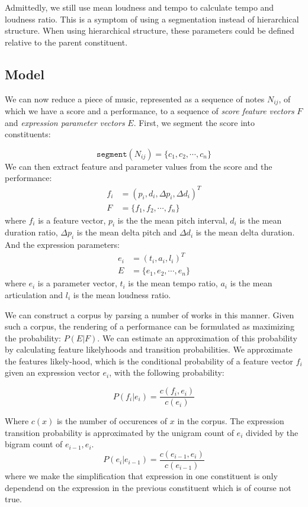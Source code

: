 \documentclass[a4paper,10pt]{article}
\begin{document}
Admittedly, we still use mean loudness and tempo to calculate tempo and loudness ratio. This is a symptom of using a segmentation instead of hierarchical structure. When using hierarchical structure, these parameters could be defined relative to the parent constituent.

\subsection{Model}
\label{sec:model}


We can now reduce a piece of music, represented as a sequence of notes $N_{ij}$, of which we have a score and a performance, to a sequence of \textit{score feature vectors} $F$ and \textit{expression parameter vectors} $E$. First, we segment the score into constituents:

\[\texttt{segment}(N_{ij}) = \{c_1, c_2, \cdots, c_n\}\]
We can then extract feature and parameter values from the score and the performance:
\begin{align*}
f_i &= (p_i, d_i, \Delta p_i, \Delta d_i)^T\\
F &= \{f_1, f_2, \cdots, f_n\}
\end{align*}
where $f_i$ is a feature vector, $p_i$ is the the mean pitch interval, $d_i$ is the mean duration ratio, $\Delta p_i$ is the mean delta pitch and $\Delta d_i$ is the mean delta duration.
And the expression parameters: 
\begin{align*}
e_i &= (t_i, a_i, l_i)^T\\
E &= \{e_1, e_2, \cdots, e_n\}
\end{align*}
where $e_i$ is a parameter vector, $t_i$ is the mean tempo ratio, $a_i$ is the mean articulation and $l_i$ is the mean loudness ratio.

We can construct a corpus by parsing a number of works in this manner. Given such a corpus, the rendering of a performance can be formulated as maximizing the probability: $P(E|F)$. We can estimate an approximation of this probability by calculating feature likelyhoods and transition probabilities. We approximate the features likely-hood, which is the conditional probability of a feature vector $f_i$ given an expression vector $e_i$, with the following probability:

\begin{equation}
\label{emission}
P(f_i|e_i) = \frac{c(f_i, e_i)}{c(e_i)}
\end{equation}

Where $c(x)$ is the number of occurences of $x$ in the corpus.
The expression transition probability is approximated by the unigram count of $e_i$ divided by the bigram count of $e_{i-1}, e_i$.
\begin{equation}
\label{transition}
P(e_i|e_{i-1}) = \frac{c(e_{i-1}, e_i)}{c(e_{i-1})}
\end{equation}
where we make the simplification that expression in one constituent is only dependend on the expression in the previous constituent which is of course not true.
\end{document}
